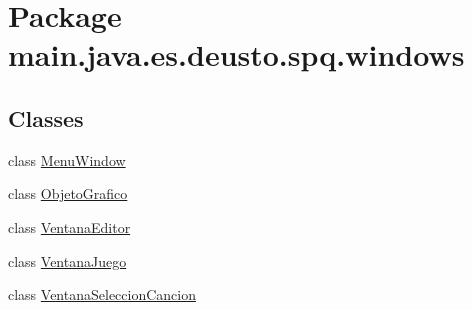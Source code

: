 \hypertarget{namespacemain_1_1java_1_1es_1_1deusto_1_1spq_1_1windows}{}\section{Package main.\+java.\+es.\+deusto.\+spq.\+windows}
\label{namespacemain_1_1java_1_1es_1_1deusto_1_1spq_1_1windows}
\subsection*{Classes}
\begin{DoxyCompactItemize}
\item 
class \hyperlink{classmain_1_1java_1_1es_1_1deusto_1_1spq_1_1windows_1_1_menu_window}{Menu\+Window}
\item 
class \hyperlink{classmain_1_1java_1_1es_1_1deusto_1_1spq_1_1windows_1_1_objeto_grafico}{Objeto\+Grafico}
\item 
class \hyperlink{classmain_1_1java_1_1es_1_1deusto_1_1spq_1_1windows_1_1_ventana_editor}{Ventana\+Editor}
\item 
class \hyperlink{classmain_1_1java_1_1es_1_1deusto_1_1spq_1_1windows_1_1_ventana_juego}{Ventana\+Juego}
\item 
class \hyperlink{classmain_1_1java_1_1es_1_1deusto_1_1spq_1_1windows_1_1_ventana_seleccion_cancion}{Ventana\+Seleccion\+Cancion}
\end{DoxyCompactItemize}
